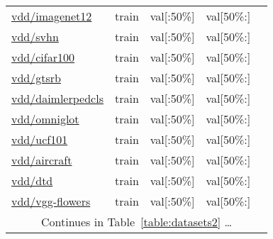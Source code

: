 \documentclass{article} \usepackage{iclr2023_conference,times}
\begin{document}
\begin{table}[h]
\begin{tabular}{lcccc}
\href{https://www.tensorflow.org/datasets/catalog/visual_domain_decathlon#visual_domain_decathlonimagenet12}{vdd/imagenet12}
& train & val[:50\%] & val[50\%:]
& \citep{hakanbilensylvestrerebuffitomasjakab2017}
\\
\href{https://www.tensorflow.org/datasets/catalog/visual_domain_decathlon#visual_domain_decathlonsvhn}{vdd/svhn}
& train & val[:50\%] & val[50\%:]
& \citep{hakanbilensylvestrerebuffitomasjakab2017}
\\
\href{https://www.tensorflow.org/datasets/catalog/visual_domain_decathlon#visual_domain_decathloncifar100}{vdd/cifar100}
& train & val[:50\%] & val[50\%:]
& \citep{hakanbilensylvestrerebuffitomasjakab2017}
\\
\href{https://www.tensorflow.org/datasets/catalog/visual_domain_decathlon#visual_domain_decathlongtsrb}{vdd/gtsrb}
& train & val[:50\%] & val[50\%:]
& \citep{hakanbilensylvestrerebuffitomasjakab2017}
\\
\href{https://www.tensorflow.org/datasets/catalog/visual_domain_decathlon#visual_domain_decathlondaimlerpedcls}{vdd/daimlerpedcls}
& train & val[:50\%] & val[50\%:]
& \citep{hakanbilensylvestrerebuffitomasjakab2017}
\\
\href{https://www.tensorflow.org/datasets/catalog/visual_domain_decathlon#visual_domain_decathlonomniglot}{vdd/omniglot}
& train & val[:50\%] & val[50\%:]
& \citep{hakanbilensylvestrerebuffitomasjakab2017}
\\
\href{https://www.tensorflow.org/datasets/catalog/visual_domain_decathlon#visual_domain_decathlonucf101}{vdd/ucf101}
& train & val[:50\%] & val[50\%:]
& \citep{hakanbilensylvestrerebuffitomasjakab2017}
\\
\href{https://www.tensorflow.org/datasets/catalog/visual_domain_decathlon#visual_domain_decathlonaircraft_default_config}{vdd/aircraft}
& train & val[:50\%] & val[50\%:]
& \citep{hakanbilensylvestrerebuffitomasjakab2017}
\\
\href{https://www.tensorflow.org/datasets/catalog/visual_domain_decathlon#visual_domain_decathlondtd}{vdd/dtd}
& train & val[:50\%] & val[50\%:]
& \citep{hakanbilensylvestrerebuffitomasjakab2017}
\\
\href{https://www.tensorflow.org/datasets/catalog/visual_domain_decathlon#visual_domain_decathlonvgg-flowers}{vdd/vgg-flowers}
& train & val[:50\%] & val[50\%:]
& \citep{hakanbilensylvestrerebuffitomasjakab2017}
\\
    \midrule
\multicolumn{5}{c}{Continues in Table~\ref{table:datasets2} \dots}  \\
\bottomrule
  \end{tabular}
\end{table}
\end{document}
